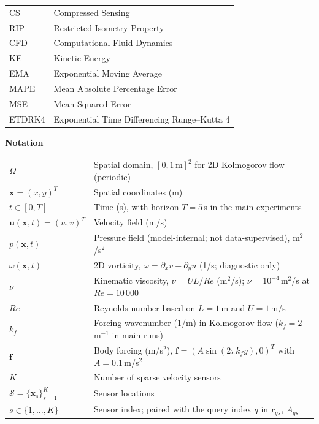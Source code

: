 {\begin{tabularx}{\textwidth}{@{}>{\raggedright\arraybackslash}p{2.8cm} >{\raggedright\arraybackslash}X@{}}
CS       & Compressed Sensing \\
RIP      & Restricted Isometry Property \\
CFD      & Computational Fluid Dynamics \\
KE       & Kinetic Energy \\
EMA      & Exponential Moving Average \\
MAPE     & Mean Absolute Percentage Error \\
MSE      & Mean Squared Error \\
ETDRK4   & Exponential Time Differencing Runge--Kutta 4 \\
\end{tabularx}}

\par\addvspace{1em}
\noindent\begin{minipage}{\textwidth}
\textbf{Notation}\par\vspace{0.5em}
\renewcommand{\arraystretch}{0.72}%
\begin{tabularx}{\textwidth}{@{}>{\raggedright\arraybackslash}p{3.2cm} >{\raggedright\arraybackslash}X@{}}
$\Omega$ & Spatial domain, $[0,1\,\mathrm{m}]^2$ for 2D Kolmogorov flow (periodic) \\
$\mathbf{x} = (x,y)^T$ & Spatial coordinates (m) \\
$t \in [0, T]$ & Time (s), with horizon $T = 5$\,s in the main experiments \\
$\mathbf{u}(\mathbf{x},t) = (u,v)^T$ & Velocity field (m/s) \\
$p(\mathbf{x},t)$ & Pressure field (model-internal; not data-supervised), m$^2$/s$^2$ \\
$\omega(\mathbf{x},t)$ & 2D vorticity, $\omega = \partial_x v - \partial_y u$ (1/s; diagnostic only) \\
$\nu$ & Kinematic viscosity, $\nu = U L / Re$ (m$^2$/s); $\nu = 10^{-4}$\,m$^2$/s at $Re=10\,000$ \\
$Re$ & Reynolds number based on $L = 1$\,m and $U = 1$\,m/s \\
$k_f$ & Forcing wavenumber (1/m) in Kolmogorov flow ($k_f=2$\,m$^{-1}$ in main runs) \\
$\mathbf{f}$ & Body forcing (m/s$^2$), $\mathbf{f} = (A\sin(2\pi k_f y), 0)^T$ with $A = 0.1$\,m/s$^2$ \\
$K$ & Number of sparse velocity sensors \\
$\mathcal{S} = \{\mathbf{x}_s\}_{s=1}^K$ & Sensor locations \\
$s \in \{1,\dots,K\}$ & Sensor index; paired with the query index $q$ in $\mathbf{r}_{qs}$, $A_{qs}$ \\

\end{tabularx}
\end{minipage}
